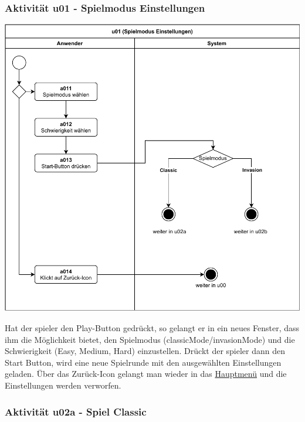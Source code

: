 \subsubsection{Aktivität u01 - Spielmodus Einstellungen}

\vspace*{1cm}
   
\includegraphics[width=\linewidth]{diagramme/pdf/UML-Activity-u01.pdf}
\label{fig:dia:gameMode}
\vspace*{0.5cm}


Hat der \gls{spieler} den Play-Button gedrückt, so gelangt er in ein neues Fenster, dass ihm die Möglichkeit bietet, den Spielmodus (\gls{classicMode}/\gls{invasionMode}) und die Schwierigkeit (Easy, Medium, Hard) einzustellen. Drückt der \gls{spieler} dann den Start Button, wird eine neue Spielrunde mit den ausgewählten Einstellungen geladen. Über das Zurück-Icon gelangt man wieder in das \hyperref[fig:dia:mainMenu]{Hauptmenü} und die Einstellungen werden verworfen.

\clearpage

\subsubsection{Aktivität u02a - Spiel Classic}

